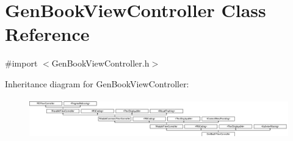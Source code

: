 \hypertarget{interface_gen_book_view_controller}{\section{Gen\-Book\-View\-Controller Class Reference}
\label{interface_gen_book_view_controller}
}


{\ttfamily \#import $<$Gen\-Book\-View\-Controller.\-h$>$}

Inheritance diagram for Gen\-Book\-View\-Controller\-:\begin{figure}[H]
\begin{center}
\leavevmode
\includegraphics[height=1.750000cm]{interface_gen_book_view_controller}
\end{center}
\end{figure}
